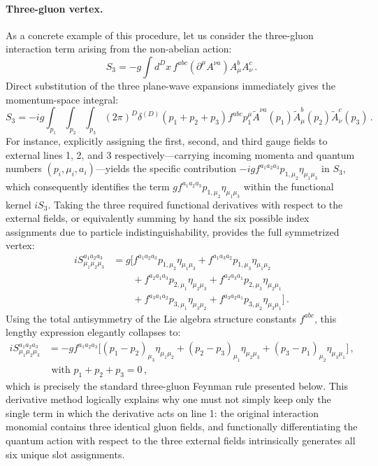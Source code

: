 \paragraph{Three-gluon vertex.}
As a concrete example of this procedure, let us consider the three-gluon interaction term arising from the non-abelian action:
\[
    S_3 = -g \int d^D x \, f^{abc} (\partial^\mu A^{\nu a}) A^b_\mu A^c_\nu \, .
\]
Direct substitution of the three plane-wave expansions immediately gives the momentum-space integral:
\[
    S_3 = -ig \int_{p_1} \int_{p_2} \int_{p_3} (2\pi)^D \delta^{(D)}(p_1 + p_2 + p_3) f^{abc} p_1^\mu \tilde{A}^{\nu a}(p_1) \tilde{A}^b_\mu(p_2) \tilde{A}^c_\nu(p_3) \, .
\]
For instance, explicitly assigning the first, second, and third gauge fields to external lines 1, 2, and 3 respectively---carrying incoming momenta and quantum numbers \((p_i, \mu_i, a_i)\)---yields the specific contribution \(-ig f^{a_1 a_2 a_3} p_{1,\mu_2} \eta_{\mu_1 \mu_3}\) in \(S_3\), which consequently identifies the term \(g f^{a_1 a_2 a_3} p_{1,\mu_2} \eta_{\mu_1 \mu_3}\) within the functional kernel \(iS_3\). Taking the three required functional derivatives with respect to the external fields, or equivalently summing by hand the six possible index assignments due to particle indistinguishability, provides the full symmetrized vertex:
\[
    \begin{aligned}
        iS^{a_1 a_2 a_3}_{\mu_1 \mu_2 \mu_3} & = g \big[ f^{a_1 a_2 a_3} p_{1,\mu_2} \eta_{\mu_1 \mu_3} + f^{a_1 a_3 a_2} p_{1,\mu_3} \eta_{\mu_1 \mu_2}           \\
                                             & \qquad + f^{a_2 a_1 a_3} p_{2,\mu_1} \eta_{\mu_2 \mu_3} + f^{a_2 a_3 a_1} p_{2,\mu_3} \eta_{\mu_2 \mu_1}            \\
                                             & \qquad + f^{a_3 a_1 a_2} p_{3,\mu_1} \eta_{\mu_3 \mu_2} + f^{a_3 a_2 a_1} p_{3,\mu_2} \eta_{\mu_3 \mu_1} \big] \, .
    \end{aligned}
\]
Using the total antisymmetry of the Lie algebra structure constants \(f^{abc}\), this lengthy expression elegantly collapses to:
\[
    \begin{aligned}
        iS^{a_1 a_2 a_3}_{\mu_1 \mu_2 \mu_3} & = -g f^{a_1 a_2 a_3} \big[ (p_1 - p_2)_{\mu_3} \eta_{\mu_1 \mu_2} + (p_2 - p_3)_{\mu_1} \eta_{\mu_2 \mu_3} + (p_3 - p_1)_{\mu_2} \eta_{\mu_3 \mu_1} \big]\, , \\
                                             & \text{ with } p_1 + p_2 + p_3 = 0 \, ,
    \end{aligned}
\]
which is precisely the standard three-gluon Feynman rule presented below. This derivative method logically explains why one must not simply keep only the single term in which the derivative acts on line 1: the original interaction monomial contains three identical gluon fields, and functionally differentiating the quantum action with respect to the three external fields intrinsically generates all six unique slot assignments.

